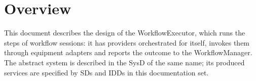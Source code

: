 \documentclass[a4paper]{arrowhead}
\begin{document}

\ArrowheadSetup

\begin{center}
  \vspace*{1cm}
  \huge{\arrowtitle}

  \vspace*{0.2cm}
  \LARGE{\arrowtype}
  \vspace*{1cm}

  
  \vspace*{\fill}

  

  \vspace*{1cm}
  \vspace*{\fill}

  \begin{abstract}
    This document describes how the WorkflowExecutor is implemented in the Java reference implementation: its internal components, the realisation of its functional and non-functional properties, its configuration and the implementation status of the other languages. Documentation edition 5.4.0.
  \end{abstract}

  \vspace*{1cm}
\end{center}

\newpage

\tableofcontents
\newpage

\section{Overview}
\label{sec:overview}
This document describes the design of the WorkflowExecutor, which runs the steps of workflow sessions: it has providers orchestrated for itself, invokes them through equipment adapters and reports the outcome to the WorkflowManager. The abstract system is described in the
SysD of the same name; its produced services are specified by SDs and IDDs in this documentation set.
\end{document}
